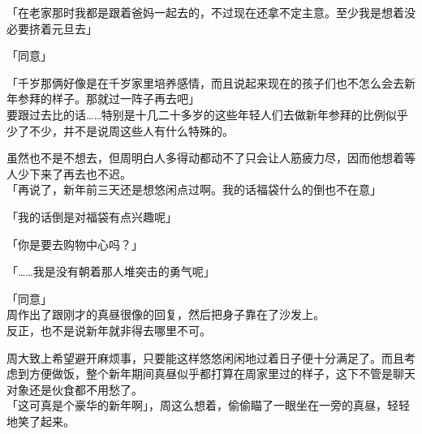 「在老家那时我都是跟着爸妈一起去的，不过现在还拿不定主意。至少我是想着没必要挤着元旦去」

「同意」

「千岁那俩好像是在千岁家里培养感情，而且说起来现在的孩子们也不怎么会去新年参拜的样子。那就过一阵子再去吧」\\

要跟过去比的话……特别是十几二十多岁的这些年轻人们去做新年参拜的比例似乎少了不少，并不是说周这些人有什么特殊的。

虽然也不是不想去，但周明白人多得动都动不了只会让人筋疲力尽，因而他想着等人少下来了再去也不迟。\\

「再说了，新年前三天还是想悠闲点过啊。我的话福袋什么的倒也不在意」

「我的话倒是对福袋有点兴趣呢」

「你是要去购物中心吗？」

「……我是没有朝着那人堆突击的勇气呢」

「同意」\\

周作出了跟刚才的真昼很像的回复，然后把身子靠在了沙发上。\\

反正，也不是说新年就非得去哪里不可。

周大致上希望避开麻烦事，只要能这样悠悠闲闲地过着日子便十分满足了。而且考虑到方便做饭，整个新年期间真昼似乎都打算在周家里过的样子，这下不管是聊天对象还是伙食都不用愁了。\\

「这可真是个豪华的新年啊」，周这么想着，偷偷瞄了一眼坐在一旁的真昼，轻轻地笑了起来。
